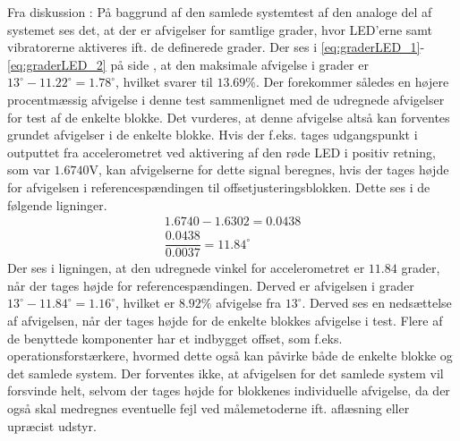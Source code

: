 Fra diskussion : På baggrund af den samlede systemtest af den analoge del af systemet ses det, at der er afvigelser for samtlige grader, hvor LED'erne samt vibratorerne aktiveres ift. de definerede grader. Der ses i \eqref{eq:graderLED_1}-\ref{eq:graderLED_2} på side \pageref{eq:graderLED_1}, at den maksimale afvigelse i grader er $13^{\circ} - 11.22^{\circ} = 1.78^{\circ}$, hvilket svarer til $13.69\%$. Der forekommer således en højere procentmæssig afvigelse i denne test sammenlignet med de udregnede afvigelser for test af de enkelte blokke. Det vurderes, at denne afvigelse altså kan forventes grundet afvigelser i de enkelte blokke. Hvis der f.eks. tages udgangspunkt i outputtet fra accelerometret ved aktivering af den røde LED i positiv retning, som var $1.6740$V, kan afvigelserne for dette signal beregnes, hvis der tages højde for afvigelsen i referencespændingen til offsetjusteringsblokken. Dette ses i de følgende ligninger.
\begin{eqnarray}
1.6740 - 1.6302 = 0.0438 \\
\dfrac{0.0438}{0.0037} = 11.84^{\circ}
\end{eqnarray}
Der ses i ligningen, at den udregnede vinkel for accelerometret er $11.84$ grader, når der tages højde for referencespændingen. Derved er afvigelsen i grader $13^{\circ} - 11.84^{\circ} = 1.16^{\circ}$, hvilket er $8.92\%$ afvigelse fra $13^{\circ}$. Derved ses en nedsættelse af afvigelsen, når der tages højde for de enkelte blokkes afvigelse i test. Flere af de benyttede komponenter har et indbygget offset, som f.eks. operationsforstærkere, hvormed dette også kan påvirke både de enkelte blokke og det samlede system. Der forventes ikke, at afvigelsen for det samlede system vil forsvinde helt, selvom der tages højde for blokkenes individuelle afvigelse, da der også skal medregnes eventuelle fejl ved målemetoderne ift. aflæsning eller upræcist udstyr. \\

